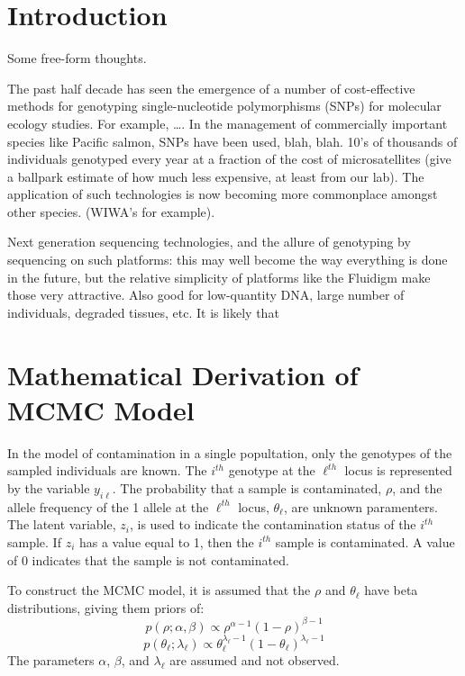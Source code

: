
\section*{Introduction}

Some free-form thoughts.

The past half decade has seen the emergence of a number of cost-effective methods for genotyping
single-nucleotide polymorphisms (SNPs) for molecular ecology studies.  For example, \ldots.
In the management of commercially important species like Pacific salmon, SNPs have been used, blah, blah.
10's of thousands of individuals genotyped every year at a fraction of the cost of microsatellites (give 
a ballpark estimate of how much less expensive, at least from our lab).  The application of such technologies 
is now becoming more commonplace amongst other species.  (WIWA's for example).  

Next generation sequencing technologies, and the allure of genotyping by sequencing on such platforms: this
may well  become the way everything is done in the future, but the relative simplicity of platforms like the 
Fluidigm make those very attractive.  Also good for low-quantity DNA, large number of individuals, degraded 
tissues, etc.  It is likely that 

\section*{Mathematical Derivation of MCMC Model}
In the model of contamination in a single popultation, only the genotypes of the sampled individuals are known. The $i^{th}$ genotype at the $\ell^{th}$ locus is represented by the variable $y_{i\ell}$.  The probability that a sample is contaminated, $\rho$, and the allele frequency of the 1 allele at the $\ell^{th}$ locus, $\theta_{\ell}$, are unknown paramenters.  The latent variable, $z_i$, is used to indicate the contamination status of the $i^{th}$ sample.  If $z_i$ has a value equal to 1, then the $i^{th}$ sample is contaminated.  A value of 0 indicates that the sample is not contaminated.  

To construct the MCMC model, it is assumed that the $\rho$ and $\theta_{\ell}$ have beta distributions, giving them priors of:
  \begin{equation} \label{rho_prior}
    p(\rho;\alpha,\beta) \propto \rho^{\alpha - 1}(1 - \rho)^{\beta - 1}
  \end{equation}
  \begin{equation} \label{theta_prior}
    p(\theta_{\ell};\lambda_{\ell}) \propto \theta_{\ell}^{\lambda_{\ell}-1}(1 - \theta_{\ell})^{\lambda_{\ell}-1}
  \end{equation}
The parameters $\alpha$, $\beta$, and $\lambda_{\ell}$ are assumed and not observed.

